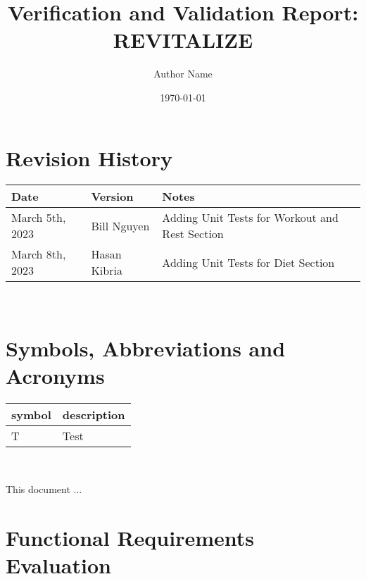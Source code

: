 \documentclass[12pt, titlepage]{article}
\begin{document}
\title{Verification and Validation Report: REVITALIZE} 
\author{Author Name}
\date{\today}

\maketitle


\section{Revision History}

\begin{tabularx}{\textwidth}{p{3cm}p{2cm}X}
	\toprule {\bf Date} & {\bf Version} & {\bf Notes}\\
	\midrule
	March 5th, 2023 & Bill Nguyen & Adding Unit Tests for Workout and Rest Section\\
	March 8th, 2023 & Hasan Kibria & Adding Unit Tests for Diet Section\\
	\bottomrule
\end{tabularx}

~\newpage

\section{Symbols, Abbreviations and Acronyms}

\renewcommand{\arraystretch}{1.2}
\begin{tabular}{l l} 
	\toprule		
	\textbf{symbol} & \textbf{description}\\
	\midrule 
	T & Test\\
	\bottomrule
\end{tabular}\\


\newpage

\tableofcontents

\listoftables %

\listoffigures %

\newpage


This document ...

\section{Functional Requirements Evaluation}
\end{document}
